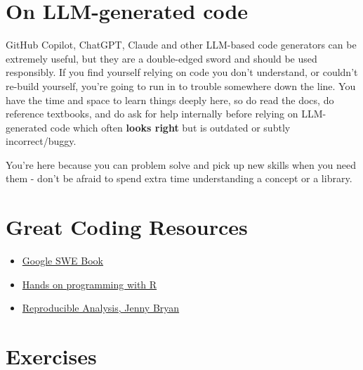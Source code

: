 \documentclass[
  letterpaper,
  DIV=11,
  numbers=noendperiod]{scrreprt}
\providecommand{\tightlist}{%
  \setlength{\itemsep}{0pt}\setlength{\parskip}{0pt}}\usepackage{longtable,booktabs,array}
\begin{document}
\section{On LLM-generated code}\label{on-llm-generated-code}

GitHub Copilot, ChatGPT, Claude and other LLM-based code generators can
be extremely useful, but they are a double-edged sword and should be
used responsibly. If you find yourself relying on code you don't
understand, or couldn't re-build yourself, you're going to run in to
trouble somewhere down the line. You have the time and space to learn
things deeply here, so do read the docs, do reference textbooks, and do
ask for help internally before relying on LLM-generated code which often
\textbf{looks right} but is outdated or subtly incorrect/buggy.

\begin{tcolorbox}[enhanced jigsaw, colback=white, opacitybacktitle=0.6, coltitle=black, left=2mm, breakable, bottomtitle=1mm, toptitle=1mm, toprule=.15mm, colframe=quarto-callout-tip-color-frame, titlerule=0mm, title=\textcolor{quarto-callout-tip-color}{\faLightbulb}\hspace{0.5em}{Tip}, colbacktitle=quarto-callout-tip-color!10!white, rightrule=.15mm, bottomrule=.15mm, arc=.35mm, opacityback=0, leftrule=.75mm]

You're here because you can problem solve and pick up new skills when
you need them - don't be afraid to spend extra time understanding a
concept or a library.

\end{tcolorbox}

\section{Great Coding Resources}\label{great-coding-resources}

\begin{itemize}
\tightlist
\item
  \href{https://abseil.io/resources/swe-book}{Google SWE Book}
\item
  \href{https://rstudio-education.github.io/hopr/}{Hands on programming
  with R}
\item
  \href{https://jennhuck.github.io/workshops/repro_analysis_R_RStudio.html}{Reproducible
  Analysis, Jenny Bryan}
\end{itemize}

\section{Exercises}\label{exercises-1}
\end{document}
